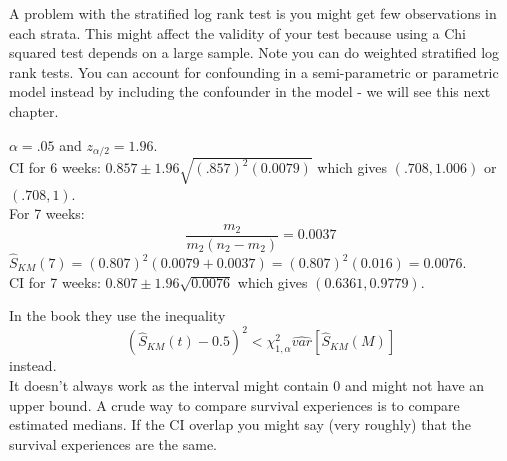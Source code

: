 \documentclass{article}
\begin{document}
A problem with the stratified log rank test is you might get few observations in each strata. This might affect the validity of your test because using a Chi squared test depends on a large sample. Note you can do weighted stratified log rank tests. You can account for confounding in a semi-parametric or parametric model instead by including the confounder in the model - we will see this next chapter.

$\alpha=.05$ and $z_{\alpha/2}=1.96$. \\

CI for 6 weeks: $0.857 \pm 1.96 \sqrt{(.857)^2(0.0079)}$ which gives $(.708,1.006)$ or $(.708,1)$. \\

For 7 weeks:
\[ \frac{m_2}{m_2(n_2-m_2)} = 0.0037
\]
$\hat{S}_{KM}(7) = (0.807)^2(0.0079+0.0037)=(0.807)^2(0.016) = 0.0076 $. \\
CI for 7 weeks: $0.807 \pm 1.96 \sqrt{0.0076}$ which gives $(0.6361, 0.9779)$.

In the book they use the inequality
\[
(\hat{S}_{KM}(t) - 0.5)^2 < \chi^2_{1,\alpha}\hat{var}[\hat{S}_{KM}(M)]
\]
instead. \\
It doesn't always work as the interval might contain 0 and might not have an upper bound.
A crude way to compare survival experiences is to compare estimated medians. If the CI overlap you might say (very roughly) that the survival experiences are the same.
\end{document}
